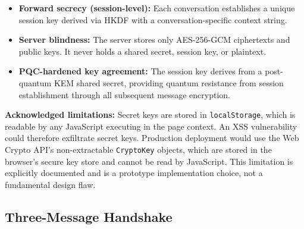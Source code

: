 \documentclass[12pt,a4paper]{report}
\begin{document}
\begin{itemize}
  \item \textbf{Forward secrecy (session-level):} Each conversation establishes a
  unique session key derived via HKDF with a conversation-specific context string.

  \item \textbf{Server blindness:} The server stores only AES-256-GCM ciphertexts
  and public keys. It never holds a shared secret, session key, or plaintext.

  \item \textbf{PQC-hardened key agreement:} The session key derives from a
  post-quantum KEM shared secret, providing quantum resistance from session establishment
  through all subsequent message encryption.
\end{itemize}

\textbf{Acknowledged limitations:} Secret keys are stored in \texttt{localStorage},
which is readable by any JavaScript executing in the page context. An XSS vulnerability
could therefore exfiltrate secret keys. Production deployment would use the Web Crypto
API's non-extractable \texttt{CryptoKey} objects, which are stored in the browser's
secure key store and cannot be read by JavaScript. This limitation is explicitly
documented and is a prototype implementation choice, not a fundamental design flaw.

\subsection{Three-Message Handshake}
\end{document}
